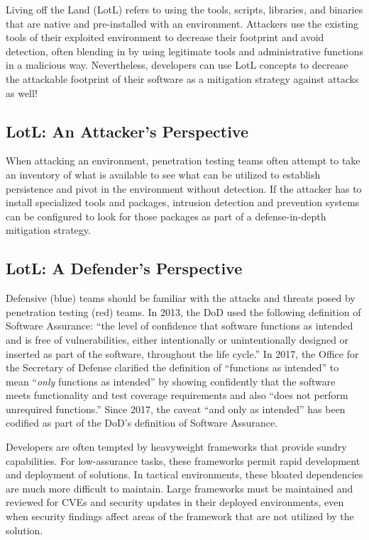 Living off the Land (LotL) refers to using the tools, scripts, libraries, and binaries that are native and pre-installed with an environment.\autocite[\pno~299]{20210621:rains2020cybersecurity} Attackers use the existing tools of their exploited environment to decrease their footprint and avoid detection, often blending in by using legitimate tools and administrative functions in a malicious way.\autocite[\pno~45]{20210621:calder2020cyber} Nevertheless, developers can use LotL concepts to decrease the attackable footprint of their software as a mitigation strategy against attacks as well!

\subsection{LotL: An Attacker's Perspective}

When attacking an environment, penetration testing teams often attempt to take an inventory of what is available to see what can be utilized to establish persistence and pivot in the environment without detection. If the attacker has to install specialized tools and packages, intrusion detection and prevention systems can be configured to look for those packages as part of a defense-in-depth mitigation strategy.

\subsection{LotL: A Defender's Perspective}

Defensive (blue) teams should be familiar with the attacks and threats posed by penetration testing (red) teams. In 2013, the DoD used the following definition of Software Assurance: ``the level of confidence that software functions as intended and is free of vulnerabilities, either intentionally or unintentionally designed or inserted as part of the software, throughout the life cycle.''\autocite[\pno~255 §933.e.2]{20210621:ndaa2013} In 2017, the Office for the Secretary of Defense clarified the definition of ``functions as intended'' to mean ``\textit{only} functions as intended'' by showing confidently that the software meets functionality and test coverage requirements and also ``does not perform unrequired functions.''\autocite[\pno~7]{20210617:marien2017} Since 2017, the caveat ``and only as intended'' has been codified as part of the DoD's definition of Software Assurance.\autocite[\pno~2]{20210617:hurt2017}

Developers are often tempted by heavyweight frameworks that provide sundry capabilities. For low-assurance tasks, these frameworks permit rapid development and deployment of solutions. In tactical environments, these bloated dependencies are much more difficult to maintain. Large frameworks must be maintained and reviewed for CVEs and security updates in their deployed environments, even when security findings affect areas of the framework that are not utilized by the solution.

